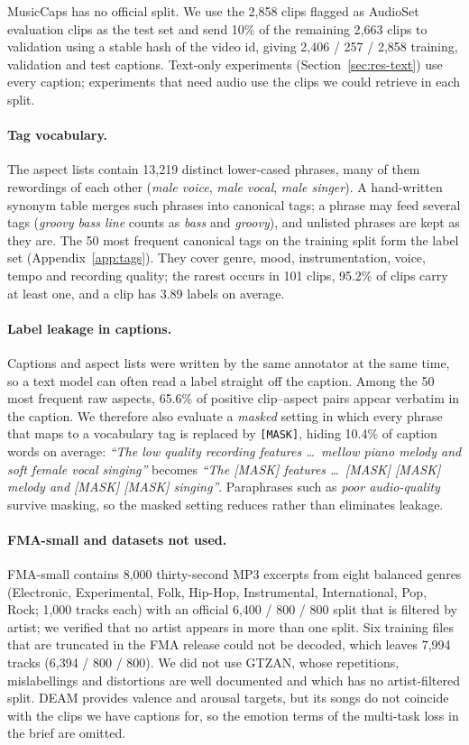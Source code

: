 \documentclass{article}
\begin{document}
MusicCaps has no official split. We use the 2,858 clips flagged as AudioSet evaluation clips as the test set and send
10\% of the remaining 2,663 clips to validation using a stable hash of the video id, giving 2,406 / 257 / 2,858
training, validation and test captions. Text-only experiments (Section~\ref{sec:res-text}) use every caption;
experiments that need audio use the clips we could retrieve in each split.

\paragraph{Tag vocabulary.}
The aspect lists contain 13,219 distinct lower-cased phrases, many of them rewordings of each other (\emph{male voice},
\emph{male vocal}, \emph{male singer}). A hand-written synonym table merges such phrases into canonical tags; a phrase
may feed several tags (\emph{groovy bass line} counts as \emph{bass} and \emph{groovy}), and unlisted phrases are kept as
they are. The 50 most frequent canonical tags on the training split form the label set (Appendix~\ref{app:tags}). They
cover genre, mood, instrumentation, voice, tempo and recording quality; the rarest occurs in 101 clips, 95.2\% of clips
carry at least one, and a clip has 3.89 labels on average.

\paragraph{Label leakage in captions.}
Captions and aspect lists were written by the same annotator at the same time, so a text model can often read a
label straight off the caption. Among the 50 most frequent raw aspects, 65.6\% of positive clip--aspect pairs appear
verbatim in the caption. We therefore also evaluate a \emph{masked} setting in which every phrase that maps to a
vocabulary tag is replaced by \texttt{[MASK]}, hiding 10.4\% of caption words on average: \emph{``The low quality
recording features \dots\ mellow piano melody and soft female vocal singing''} becomes \emph{``The [MASK] features
\dots\ [MASK] [MASK] melody and [MASK] [MASK] singing''}. Paraphrases such as \emph{poor audio-quality} survive
masking, so the masked setting reduces rather than eliminates leakage.

\paragraph{FMA-small and datasets not used.}
FMA-small \citep{defferrard2017fma} contains 8,000 thirty-second MP3 excerpts from eight balanced genres (Electronic,
Experimental, Folk, Hip-Hop, Instrumental, International, Pop, Rock; 1,000 tracks each) with an official
6,400 / 800 / 800 split that is filtered by artist; we verified that no artist appears in more than one split. Six
training files that are truncated in the FMA release could not be decoded, which leaves 7,994 tracks
(6,394 / 800 / 800). We did not use GTZAN, whose repetitions, mislabellings and distortions are well documented
\citep{sturm2013gtzan} and which has no artist-filtered split. DEAM provides valence and arousal targets, but its songs
do not coincide with the clips we have captions for, so the emotion terms of the multi-task loss in the brief are
omitted.
\end{document}
